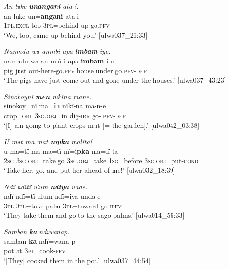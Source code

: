 
\ea%
    \label{ex:otherwc:7}
            \textit{An luke} \textbf{\textit{unangani}} \textit{ata i.}\\
\gll    an      luke  un=\textbf{angani}  ata  i\\
    1\textsc{pl.excl}  too    \textsc{3pl}=behind  up  go.\textsc{pfv}\\
\glt `We, too, came up behind you.’ [ulwa037\_26:33]
\z

\ea%
    \label{ex:otherwc:8}
            \textit{Namndu wa anmbi apa} \textbf{\textit{imbam}} \textit{iye.}\\
\gll    namndu  wa  an-mbï-i      apa    \textbf{imbam}  i-e\\
    pig      just  out-here-go.\textsc{pfv}  house  under    go.\textsc{pfv-dep}\\
\glt `The pigs have just come out and gone under the houses.’ [ulwa037\_43:23]
\z

\ea%
    \label{ex:otherwc:9}
            \textit{Sinokoynï} \textbf{\textit{men}} \textit{nïkïna mane.}\\
\gll    sinokoy=nï  ma=\textbf{in}      nïkï-na  ma-n-e\\
    crop=\textsc{obl}    3\textsc{sg.obj}=in  dig{}-\textsc{irr}  go-\textsc{ipfv-dep}\\
\glt `[I] am going to plant crops in it [= the garden].’ [ulwa042\_03:38]
\z

\ea%
    \label{ex:otherwc:10}
          \textit{U mat ma mat} \textbf{\textit{nipka}} \textit{malïta!}\\
\gll    u    ma=tï      ma  ma=tï      nï=\textbf{ipka} ma=lï-ta\\
    \textsc{2sg}  3\textsc{sg.obj}=take  go  \textsc{3sg.obj}=take  1\textsc{sg}=before    3\textsc{sg.obj}=put-\textsc{cond}\\
\glt `Take her, go, and put her ahead of me!’ [ulwa032\_18:39]
\z

\ea%
    \label{ex:otherwc:11}
          \textit{Ndï ndïtï ulum} \textbf{\textit{ndiya}} \textit{unde.}\\
\gll    ndï  ndï=tï    ulum  ndï=iya    unda-e\\
    3\textsc{pl}  3\textsc{pl}=take  palm  3\textsc{pl}=toward  go-\textsc{ipfv}\\
\glt `They take them and go to the sago palms.’ [ulwa014\_56:33]
\z

\ea%
    \label{ex:otherwc:12}
          \textit{Samban} \textbf{\textit{ka}} \textit{ndïwanap.}\\
\gll    samban  \textbf{ka}  ndï=wana-p\\
    pot      at  3\textsc{pl}=cook-\textsc{pfv}\\
\glt `[They] cooked them in the pot.’ [ulwa037\_44:54]
\z

